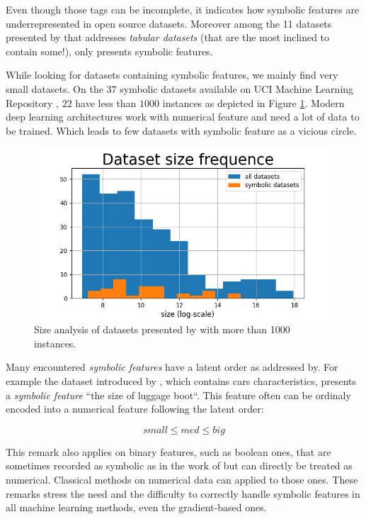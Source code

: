 Even though those tags can be incomplete, it indicates how symbolic features are underrepresented in open source datasets. Moreover among the 11 datasets presented by \cite{RevisitingDeepForTabular} that addresses \textit{tabular datasets} (that are the most inclined to contain some!), only \cite{incomeDataset} presents symbolic features.


While looking for datasets containing symbolic features, we mainly find very small datasets. On the $37$ symbolic datasets available on UCI Machine Learning Repository \cite{UCI}, $22$ have less than $1000$ instances as depicted in Figure \ref{fig:size}. Modern deep learning architectures work with numerical feature and need a lot of data to be trained. Which leads to few datasets with symbolic feature as a vicious circle.

\begin{figure}[h!]
  \centering
  \includegraphics[width=0.5\linewidth]{figures/dataset-size-frequence.png}
  \caption{Size analysis of datasets presented by \cite{UCI}  with more than 1000 instances.
  }
  \label{fig:size}
\end{figure}

Many encountered \textit{symbolic features} have a latent order as addressed by\cite{OCD}. For example the dataset introduced by  \cite{CarDataset}, which contains cars characteristics, presents a \textit{symbolic feature} ``the size of luggage boot``. This feature often can be ordinaly encoded into a numerical feature following the latent order:

\begin{equation*}
    small \leq med \leq big
\end{equation*}

This remark also applies on binary features, such as boolean ones, that are sometimes recorded as symbolic as in the work of \cite{SPECT} but can directly be treated as numerical. Classical methods on numerical data can applied to those ones.
These remarks stress the need and the difficulty to correctly handle symbolic features in all machine learning methods, even the gradient-based ones.

